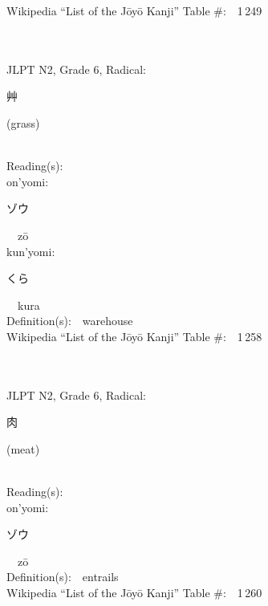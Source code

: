 \begin{multicols}{2}
Wikipedia ``List of the J\=oy\=o Kanji'' Table \#:\ \ 1\,249 \\
\ \ \\
{\fontsize{34pt}{40pt}  }\ \ \\  %
{JLPT N2, Grade 6, Radical:\ \ {\begin{CJK}{UTF8}{min} 艸 \end{CJK}} (grass) } \\
Reading(s):\ \ \\
{\hspace*{1em}}on'yomi:\ \ \\
{\hspace*{2em}}{\begin{CJK}{UTF8}{min} ゾウ \end{CJK}}\ \ z\=o\ \ \\
{\hspace*{1em}}kun'yomi:\ \ \\
{\hspace*{2em}}{\begin{CJK}{UTF8}{min} くら \end{CJK}}\ \ kura\ \ \\
Definition(s):\ \ warehouse \\
Wikipedia ``List of the J\=oy\=o Kanji'' Table \#:\ \ 1\,258 \\
\ \ \\
{\fontsize{34pt}{40pt}  }\ \ \\  %
{JLPT N2, Grade 6, Radical:\ \ {\begin{CJK}{UTF8}{min} 肉 \end{CJK}} (meat) } \\
Reading(s):\ \ \\
{\hspace*{1em}}on'yomi:\ \ \\
{\hspace*{2em}}{\begin{CJK}{UTF8}{min} ゾウ \end{CJK}}\ \ z\=o\ \ \\
Definition(s):\ \ entrails \\
Wikipedia ``List of the J\=oy\=o Kanji'' Table \#:\ \ 1\,260 \\

\end{multicols}
